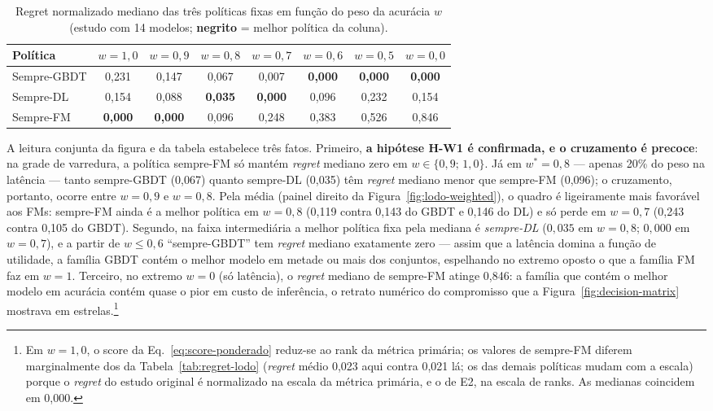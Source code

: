 \begin{table}[htb]
\centering
\caption[Regret mediano por peso da acurácia]{Regret normalizado mediano das três políticas fixas em função do
peso da acurácia $w$ (estudo com 14 modelos; \textbf{negrito} = melhor
política da coluna).}
\label{tab:weighted-regret}
\small
\begin{tabular}{lccccccc}
\toprule
Política & $w{=}1{,}0$ & $w{=}0{,}9$ & $w{=}0{,}8$ & $w{=}0{,}7$ &
$w{=}0{,}6$ & $w{=}0{,}5$ & $w{=}0{,}0$ \\
\midrule
Sempre-GBDT & 0,231 & 0,147 & 0,067 & 0,007 & \textbf{0,000} &
\textbf{0,000} & \textbf{0,000} \\
Sempre-DL   & 0,154 & 0,088 & \textbf{0,035} & \textbf{0,000} & 0,096 &
0,232 & 0,154 \\
Sempre-FM   & \textbf{0,000} & \textbf{0,000} & 0,096 & 0,248 & 0,383 &
0,526 & 0,846 \\
\bottomrule
\end{tabular}
\end{table}

A leitura conjunta da figura e da tabela estabelece três fatos.
Primeiro, \textbf{a hipótese H-W1 é confirmada, e o cruzamento é
precoce}: na grade de varredura, a política sempre-FM só mantém \emph{regret}
mediano zero em $w \in \{0{,}9;\, 1{,}0\}$. Já em $w^{*}{=}0{,}8$ ---
apenas 20\% do peso na latência --- tanto sempre-GBDT (0,067) quanto
sempre-DL (0,035) têm \emph{regret} mediano menor que sempre-FM (0,096); o
cruzamento, portanto, ocorre entre $w{=}0{,}9$ e $w{=}0{,}8$. Pela
média (painel direito da Figura~\ref{fig:lodo-weighted}), o quadro é
ligeiramente mais favorável aos FMs: sempre-FM ainda é a melhor
política em $w{=}0{,}8$ (0,119 contra 0,143 do GBDT e 0,146 do DL) e
só perde em $w{=}0{,}7$ (0,243 contra 0,105 do GBDT). Segundo, na faixa intermediária a melhor política fixa pela mediana é
\emph{sempre-DL} ($0{,}035$ em $w{=}0{,}8$; $0{,}000$ em $w{=}0{,}7$),
e a partir
de $w \leq 0{,}6$ ``sempre-GBDT'' tem \emph{regret} mediano exatamente zero ---
assim que a latência domina a função de utilidade, a família GBDT
contém o melhor modelo em metade ou mais dos conjuntos, espelhando no
extremo oposto o que a família FM faz em $w{=}1$. Terceiro, no extremo
$w{=}0$ (só latência), o \emph{regret} mediano de sempre-FM atinge 0,846: a
família que contém o melhor modelo em acurácia contém quase o pior em
custo de inferência, o retrato numérico do compromisso que a
Figura~\ref{fig:decision-matrix} mostrava em estrelas.\footnote{Em
$w{=}1{,}0$, o score da Eq.~\ref{eq:score-ponderado} reduz-se ao rank
da métrica primária; os valores de sempre-FM diferem marginalmente dos da
Tabela~\ref{tab:regret-lodo} (\emph{regret} médio 0,023 aqui
contra 0,021 lá; os das demais políticas mudam com a escala) porque o \emph{regret} do estudo original é normalizado na
escala da métrica primária, e o de E2, na escala de ranks. As medianas
coincidem em 0,000.}

